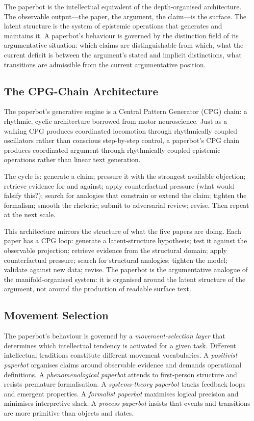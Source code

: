 \documentclass[12pt, letterpaper]{article}
\theoremstyle{remark}
\begin{document}
The paperbot is the intellectual equivalent of the depth-organised
architecture.  The observable output---the paper, the argument, the claim---is
the surface.  The latent structure is the system of epistemic operations that
generates and maintains it.  A paperbot's behaviour is governed by the
distinction field of its argumentative situation: which claims are
distinguishable from which, what the current deficit is between the argument's
stated and implicit distinctions, what transitions are admissible from the
current argumentative position.

\subsection{The CPG-Chain Architecture}

The paperbot's generative engine is a Central Pattern Generator (CPG) chain:
a rhythmic, cyclic architecture borrowed from motor neuroscience.  Just as a
walking CPG produces coordinated locomotion through rhythmically coupled
oscillators rather than conscious step-by-step control, a paperbot's CPG
chain produces coordinated argument through rhythmically coupled epistemic
operations rather than linear text generation.

The cycle is: generate a claim; pressure it with the strongest available
objection; retrieve evidence for and against; apply counterfactual pressure
(what would falsify this?); search for analogies that constrain or extend
the claim; tighten the formalism; smooth the rhetoric; submit to adversarial
review; revise.  Then repeat at the next scale.

This architecture mirrors the structure of what the five papers are doing.
Each paper has a CPG loop: generate a latent-structure hypothesis; test it
against the observable projection; retrieve evidence from the structural
domain; apply counterfactual pressure; search for structural analogies;
tighten the model; validate against new data; revise.  The paperbot is the
argumentative analogue of the manifold-organised system: it is organised
around the latent structure of the argument, not around the production of
readable surface text.

\subsection{Movement Selection}

The paperbot's behaviour is governed by a \emph{movement-selection layer}
that determines which intellectual tendency is activated for a given task.
Different intellectual traditions constitute different movement vocabularies.
A \emph{positivist paperbot} organises claims around observable evidence and
demands operational definitions.  A \emph{phenomenological paperbot} attends
to first-person structure and resists premature formalisation.  A
\emph{systems-theory paperbot} tracks feedback loops and emergent properties.
A \emph{formalist paperbot} maximises logical precision and minimises
interpretive slack.  A \emph{process paperbot} insists that events and
transitions are more primitive than objects and states.
\end{document}
